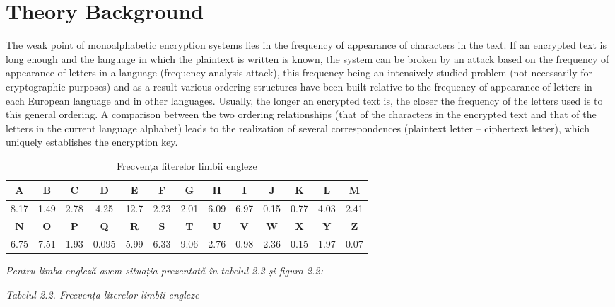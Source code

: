 \documentclass[12pt]{article}
\begin{document}
\setcounter{page}{2}
\pagestyle{fancy}
\fancyhf{}
\rhead{\thepage}




\section*{Theory Background}
\hspace{0.8cm}

The weak point of monoalphabetic encryption systems lies in the frequency of appearance of characters in the text. If an encrypted text is long enough and the language in which the plaintext is written is known, the system can be broken by an attack based on the frequency of appearance of letters in a language (frequency analysis attack), this frequency being an intensively studied problem (not necessarily for cryptographic purposes) and as a result various ordering structures have been built relative to the frequency of appearance of letters in each European language and in other languages. Usually, the longer an encrypted text is, the closer the frequency of the letters used is to this general ordering. A comparison between the two ordering relationships (that of the characters in the encrypted text and that of the letters in the current language alphabet) leads to the realization of several correspondences (plaintext letter – ciphertext letter), which uniquely establishes the encryption key.
\begin{table}[h!]
    \centering
    \caption{Frecvența literelor limbii engleze}
    \label{tab:freq_eng}
    \begin{tabular}{|c|c|c|c|c|c|c|c|c|c|c|c|c|}
        \hline
        \textbf{A} & \textbf{B} & \textbf{C} & \textbf{D} & \textbf{E} & \textbf{F} & \textbf{G} & \textbf{H} & \textbf{I} & \textbf{J} & \textbf{K} & \textbf{L} & \textbf{M} \\
        \hline
        8.17 & 1.49 & 2.78 & 4.25 & 12.7 & 2.23 & 2.01 & 6.09 & 6.97 & 0.15 & 0.77 & 4.03 & 2.41 \\
        \hline
        \textbf{N} & \textbf{O} & \textbf{P} & \textbf{Q} & \textbf{R} & \textbf{S} & \textbf{T} & \textbf{U} & \textbf{V} & \textbf{W} & \textbf{X} & \textbf{Y} & \textbf{Z} \\
        \hline
        6.75 & 7.51 & 1.93 & 0.095 & 5.99 & 6.33 & 9.06 & 2.76 & 0.98 & 2.36 & 0.15 & 1.97 & 0.07 \\
        \hline
    \end{tabular}
    \parbox{\textwidth}{\small \textit{Pentru limba engleză avem situația prezentată în tabelul 2.2 și figura 2.2:}}
    \parbox{\textwidth}{\small \textit{Tabelul 2.2. Frecvența literelor limbii engleze}}
\end{table}
\end{document}
